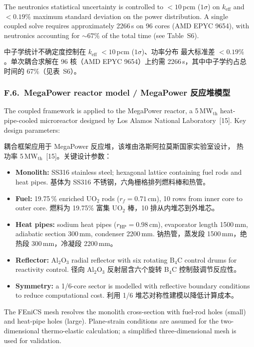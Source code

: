 \documentclass[11pt,a4paper]{article}
\newcommand{\keff}{\ensuremath{k_{\mathrm{eff}}}}
\begin{document}
The neutronics statistical uncertainty is controlled to
$<10$\,pcm ($1\sigma$) on \keff{} and $<0.19\%$ maximum
standard deviation on the power distribution. A single coupled solve
requires approximately 2266\,s on 96 cores (AMD EPYC 9654), with
neutronics accounting for ${\sim}67\%$ of the total time (see
Table~S6).

中子学统计不确定度控制在 \keff{} $< 10$\,pcm ($1\sigma$)、功率分布
最大标准差 $< 0.19\%$。单次耦合求解在 96 核（AMD EPYC 9654）上约需
2266\,s，其中中子学约占总时间的 67\%（见表~S6）。


\subsubsection*{F.6.~MegaPower reactor model / MegaPower 反应堆模型}

The coupled framework is applied to the MegaPower reactor, a
5\,MW$_\mathrm{th}$ heat-pipe-cooled microreactor designed by Los Alamos
National Laboratory~[15]. Key design parameters:

耦合框架应用于 MegaPower 反应堆，该堆由洛斯阿拉莫斯国家实验室设计，
热功率 5\,MW$_\mathrm{th}$~[15]。关键设计参数：

\begin{itemize}\setlength{\itemsep}{0.15em}
\item \textbf{Monolith:} SS316 stainless steel; hexagonal lattice
  containing fuel rods and heat pipes.
  基体为 SS316 不锈钢，六角栅格排列燃料棒和热管。
\item \textbf{Fuel:} 19.75\,\% enriched UO$_2$ rods ($r_f = 0.71$\,cm),
  10 rows from inner core to outer core.
  燃料为 19.75\% 富集 UO$_2$ 棒，10 排从内堆芯到外堆芯。
\item \textbf{Heat pipes:} sodium heat pipes ($r_\mathrm{HP} = 0.98$\,cm),
  evaporator length 1500\,mm, adiabatic section 300\,mm, condenser
  2200\,mm.
  钠热管，蒸发段 1500\,mm，绝热段 300\,mm，冷凝段 2200\,mm。
\item \textbf{Reflector:} Al$_2$O$_3$ radial reflector with six
  rotating B$_4$C control drums for reactivity control.
  径向 Al$_2$O$_3$ 反射层含六个旋转 B$_4$C 控制鼓调节反应性。
\item \textbf{Symmetry:} a 1/6-core sector is modelled with reflective
  boundary conditions to reduce computational cost.
  利用 1/6 堆芯对称性建模以降低计算成本。
\end{itemize}

The FEniCS mesh resolves the monolith cross-section with fuel-rod holes
(small) and heat-pipe holes (large). Plane-strain conditions are
assumed for the two-dimensional thermo-elastic calculation; a simplified
three-dimensional mesh is used for validation.
\end{document}
